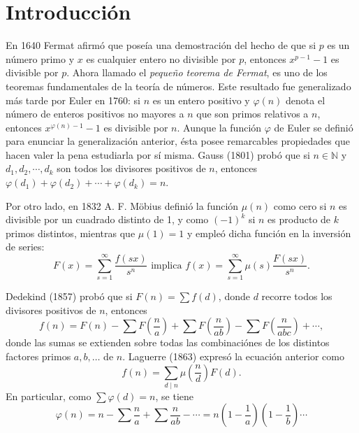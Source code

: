 \newpage
\pagestyle{title-subsection}
\section*{Introducción}

En 1640 Fermat afirmó que poseía una demostración del hecho de que si $p$ es un número primo y $x$ es cualquier entero no divisible por $p$, entonces $x^{p-1}-1$ es divisible por $p$. Ahora llamado el \emph{pequeño teorema de Fermat}, es uno de los teoremas fundamentales de la teoría de números. Este resultado fue generalizado más tarde por Euler en 1760: si $n$ es un entero positivo y $\varphi(n)$ denota el número de enteros positivos no mayores a $n$ que son primos relativos a $n$, entonces $x^{\varphi(n)-1}-1$ es divisible por $n$.
Aunque la función $\varphi$ de Euler se definió para enunciar la generalización anterior, ésta posee remarcables propiedades que hacen valer la pena estudiarla por sí misma. Gauss (1801) probó que si $n\in\mathbb{N}$ y $d_1,d_2,\cdots,d_k$ son todos los divisores positivos de $n$, entonces $\varphi(d_1)+\varphi(d_2)+\cdots+\varphi(d_k)=n$.
\bigskip

Por otro lado, en 1832 A. F. Möbius definió la función $\mu(n)$ como cero si $n$ es divisible por un cuadrado distinto de 1, y como $(-1)^k$ si $n$ es producto de $k$ primos distintos, mientras que $\mu(1)=1$ y empleó dicha función en la inversión de series:
\begin{equation*}
    F(x) = \sum_{s=1}^{\infty} \frac{f(s x)}{s^n} \text{ implica } f(x) = \sum_{s=1}^{\infty} \mu(s) \frac{F(s x)}{s^n}.
\end{equation*}

Dedekind (1857) probó que si $F(n) = \sum f(d)$, donde $d$ recorre todos los divisores positivos de $n$, entonces
\begin{equation*}
    f(n) = F(n) - \sum F \left( \frac{n}{a} \right) + \sum F \left(  \frac{n}{a b} \right) - \sum F \left( \frac{n}{a b c} \right) + \cdots,
\end{equation*}
donde las sumas se extienden sobre todas las combinaciónes de los distintos factores primos $a, b, \ldots$ de $n$. Laguerre (1863) expresó la ecuación anterior como
\begin{equation*}
    f(n) = \sum_{d \mid n} \mu \left(  \frac{n}{d} \right) F(d).
\end{equation*}
En particular, como $\sum \varphi(d) = n$, se tiene
\begin{equation*}
    \varphi(n) = n - \sum \frac{n}{a} + \sum \frac{n}{a b} - \cdots = n \left( 1 - \frac{1}{a} \right) \left( 1 - \frac{1}{b} \right) \cdots
\end{equation*}

